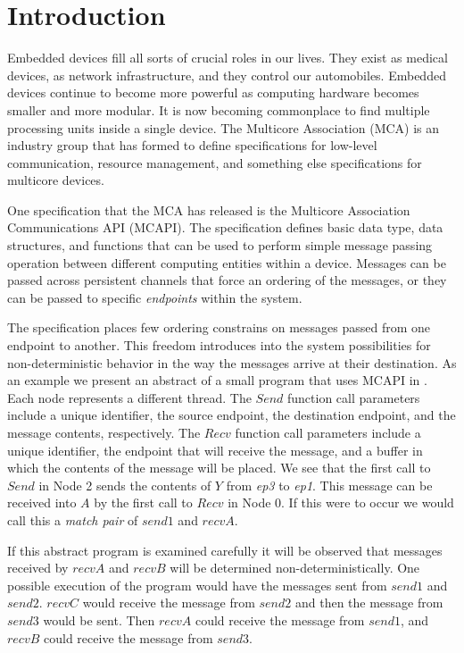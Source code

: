 \section{Introduction}
Embedded devices fill all sorts of crucial roles in our lives. They exist as
medical devices, as network infrastructure, and they control our automobiles.
Embedded devices continue to become more powerful as computing hardware becomes
smaller and more modular. It is now becoming commonplace to find multiple
processing units inside a single device. The Multicore Association (MCA) is an
industry group that has formed to define specifications for low-level
communication, resource management, and something else specifications for
multicore devices.

One specification that the MCA has released is the Multicore Association
Communications API (MCAPI). The specification defines basic data type, data
structures, and functions that can be used to perform simple message passing
operation between different computing entities within a device. Messages can be
passed across persistent channels that force an ordering of the messages, or
they can be passed to specific \emph{endpoints} within the system.

The specification places few ordering constrains on messages passed from one
endpoint to another. This freedom introduces into the system possibilities for
non-deterministic behavior in the way the messages arrive at their destination.
As an example we present an abstract of a small program that uses MCAPI in
. Each node represents a different thread. The
$\mathit{Send}$ function call parameters include a unique identifier, the
source endpoint, the destination endpoint, and the message contents,
respectively. The $\mathit{Recv}$ function call parameters include a unique
identifier, the endpoint that will receive the message, and a buffer in which
the contents of the message will be placed. We see that the first call to
$\mathit{Send}$ in Node 2 sends the contents of $Y$ from \emph{ep3} to
\emph{ep1}. This message can be received into $A$ by the first call to
$\mathit{Recv}$ in Node 0. If this were to occur we would call this a
\emph{match pair} of $\mathit{send1}$ and $\mathit{recvA}$.

If this abstract program is examined carefully it will be observed that
messages received by $\mathit{recvA}$ and $\mathit{recvB}$ will be determined
non-deterministically. One possible execution of the program would have the
messages sent from $\mathit{send1}$ and $\mathit{send2}$. $\mathit{recvC}$
would receive the message from $\mathit{send2}$ and then the message from
$\mathit{send3}$ would be sent. Then $\mathit{recvA}$ could receive the message
from $\mathit{send1}$, and $\mathit{recvB}$ could receive the message from
$\mathit{send3}$.

